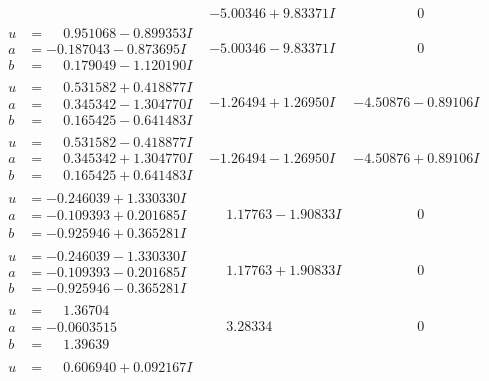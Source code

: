 \documentclass[1p]{elsarticle_modified}
\theoremstyle{definition}
\begin{document}
$$\begin{array}{c|c|c}
 & -5.00346 + 9.83371 I & \phantom{-0.000000 } 0 \\ \hline\begin{aligned}
u &= \phantom{-}0.951068 - 0.899353 I \\
a &= -0.187043 - 0.873695 I \\
b &= \phantom{-}0.179049 - 1.120190 I\end{aligned}
 & -5.00346 - 9.83371 I & \phantom{-0.000000 } 0 \\ \hline\begin{aligned}
u &= \phantom{-}0.531582 + 0.418877 I \\
a &= \phantom{-}0.345342 - 1.304770 I \\
b &= \phantom{-}0.165425 - 0.641483 I\end{aligned}
 & -1.26494 + 1.26950 I & -4.50876 - 0.89106 I \\ \hline\begin{aligned}
u &= \phantom{-}0.531582 - 0.418877 I \\
a &= \phantom{-}0.345342 + 1.304770 I \\
b &= \phantom{-}0.165425 + 0.641483 I\end{aligned}
 & -1.26494 - 1.26950 I & -4.50876 + 0.89106 I \\ \hline\begin{aligned}
u &= -0.246039 + 1.330330 I \\
a &= -0.109393 + 0.201685 I \\
b &= -0.925946 + 0.365281 I\end{aligned}
 & \phantom{-}1.17763 - 1.90833 I & \phantom{-0.000000 } 0 \\ \hline\begin{aligned}
u &= -0.246039 - 1.330330 I \\
a &= -0.109393 - 0.201685 I \\
b &= -0.925946 - 0.365281 I\end{aligned}
 & \phantom{-}1.17763 + 1.90833 I & \phantom{-0.000000 } 0 \\ \hline\begin{aligned}
u &= \phantom{-}1.36704\phantom{ +0.000000I} \\
a &= -0.0603515\phantom{ +0.000000I} \\
b &= \phantom{-}1.39639\phantom{ +0.000000I}\end{aligned}
 & \phantom{-}3.28334\phantom{ +0.000000I} & \phantom{-0.000000 } 0 \\ \hline\begin{aligned}
u &= \phantom{-}0.606940 + 0.092167 I \\

\end{aligned}
\end{array}$$
\end{document}
